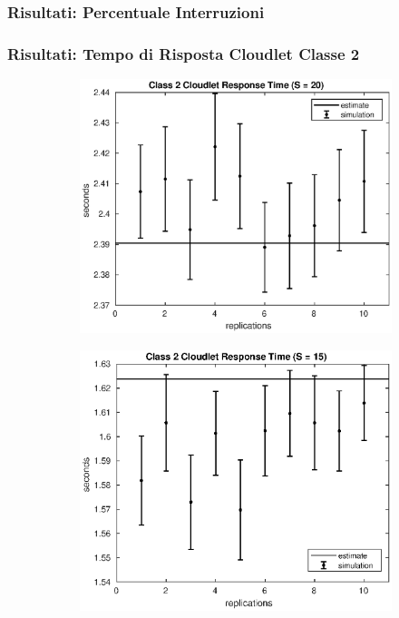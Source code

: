 \begin{frame}
\frametitle{Risultati: Percentuale Interruzioni}

\end{frame}
\begin{frame}
\frametitle{Risultati: Tempo di Risposta Cloudlet Classe 2}
\begin{figure}[!h]
\centering
%
\begin{subfigure}[t]{0.49\textwidth}
\includegraphics[width=\textwidth]{../figures/simul/20_500K_s2clet}
\label{20_s2clet}
\end{subfigure}
%
\begin{subfigure}[t]{0.49\textwidth}
\includegraphics[width=\textwidth]{../figures/simul/15_500K_s2clet}

\end{subfigure}
\end{figure}
\end{frame}
